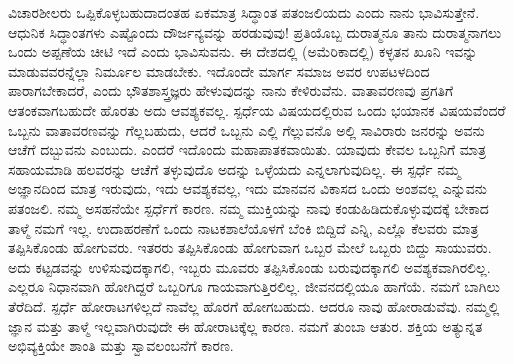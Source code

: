 ವಿಚಾರಶೀಲರು ಒಪ್ಪಿಕೊಳ್ಳಬಹುದಾದಂತಹ ಏಕಮಾತ್ರ ಸಿದ್ಧಾಂತ ಪತಂಜಲಿಯದು ಎಂದು ನಾನು ಭಾವಿಸುತ್ತೇನೆ. ಆಧುನಿಕ ಸಿದ್ಧಾಂತಗಳು ಎಷ್ಟೊಂದು ದೌರ್ಜನ್ಯವನ್ನು ಹರಡುವುವು! ಪ್ರತಿಯೊಬ್ಬ ದುರಾತ್ಮನೂ ತಾನು ದುರಾತ್ಮನಾಗಲು ಒಂದು ಅಪ್ಪಣೆಯ ಚೀಟಿ ಇದೆ ಎಂದು ಭಾವಿಸುವನು. ಈ ದೇಶದಲ್ಲಿ (ಅಮೆರಿಕಾದಲ್ಲಿ) ಕಳ್ಳತನ ಖೂನಿ ಇವನ್ನು ಮಾಡುವವರನ್ನೆಲ್ಲಾ ನಿರ್ಮೂಲ ಮಾಡಬೇಕು. ಇದೊಂದೇ ಮಾರ್ಗ ಸಮಾಜ ಅವರ ಉಪಟಳದಿಂದ ಪಾರಾಗಬೇಕಾದರೆ, ಎಂದು ಭೌತಶಾಸ್ತ್ರಜ್ಞರು ಹೇಳುವುದನ್ನು ನಾನು ಕೇಳಿರುವೆನು. ವಾತಾವರಣವು ಪ್ರಗತಿಗೆ ಆತಂಕವಾಗಬಹುದೇ ಹೊರತು ಅದು ಆವಶ್ಯಕವಲ್ಲ. ಸ್ಪರ್ಧೆಯ ವಿಷಯದಲ್ಲಿರುವ ಒಂದು ಭಯಾನಕ ವಿಷಯವೆಂದರೆ ಒಬ್ಬನು ವಾತಾವರಣವನ್ನು ಗೆಲ್ಲಬಹುದು, ಆದರೆ ಒಬ್ಬನು ಎಲ್ಲಿ ಗೆಲ್ಲುವನೊ ಅಲ್ಲಿ ಸಾವಿರಾರು ಜನರನ್ನು ಅವನು ಆಚೆಗೆ ದಬ್ಬುವನು ಎಂಬುದು. ಎಂದರೆ ಇದೊಂದು ಮಹಾಪಾತಕವಾಯಿತು. ಯಾವುದು ಕೇವಲ ಒಬ್ಬನಿಗೆ ಮಾತ್ರ ಸಹಾಯಮಾಡಿ ಹಲವರನ್ನು ಆಚೆಗೆ ತಳ್ಳುವುದೊ ಅದನ್ನು ಒಳ್ಳೆಯದು ಎನ್ನಲಾಗುವುದಿಲ್ಲ. ಈ ಸ್ಪರ್ಧೆ ನಮ್ಮ ಅಜ್ಞಾನದಿಂದ ಮಾತ್ರ ಇರುವುದು, ಇದು ಆವಶ್ಯಕವಲ್ಲ, ಇದು ಮಾನವನ ವಿಕಾಸದ ಒಂದು ಅಂಶವಲ್ಲ ಎನ್ನುವನು ಪತಂಜಲಿ. ನಮ್ಮ ಅಸಹನೆಯೇ ಸ್ಪರ್ಧೆಗೆ ಕಾರಣ. ನಮ್ಮ ಮುಕ್ತಿಯನ್ನು ನಾವು ಕಂಡುಹಿಡಿದುಕೊಳ್ಳುವುದಕ್ಕೆ ಬೇಕಾದ ತಾಳ್ಮೆ ನಮಗೆ ಇಲ್ಲ. ಉದಾಹರಣೆಗೆ ಒಂದು ನಾಟಕಶಾಲೆಯೊಳಗೆ ಬೆಂಕಿ ಬಿದ್ದಿದೆ ಎನ್ನಿ, ಎಲ್ಲೊ ಕೆಲವರು ಮಾತ್ರ ತಪ್ಪಿಸಿಕೊಂಡು ಹೋಗುವರು. ಇತರರು ತಪ್ಪಿಸಿಕೊಂಡು ಹೋಗುವಾಗ ಒಬ್ಬರ ಮೇಲೆ ಒಬ್ಬರು ಬಿದ್ದು ಸಾಯುವರು. ಅದು ಕಟ್ಟಡವನ್ನು ಉಳಿಸುವುದಕ್ಕಾಗಲಿ, ಇಬ್ಬರು ಮೂವರು ತಪ್ಪಿಸಿಕೊಂಡು ಬರುವುದಕ್ಕಾಗಲಿ ಅವಶ್ಯಕವಾಗಿರಲಿಲ್ಲ. ಎಲ್ಲರೂ ನಿಧಾನವಾಗಿ ಹೋಗಿದ್ದರೆ ಒಬ್ಬರಿಗೂ ಗಾಯವಾಗುತ್ತಿರಲಿಲ್ಲ. ಜೀವನದಲ್ಲಿಯೂ ಹಾಗೆಯೆ. ನಮಗೆ ಬಾಗಿಲು ತೆರೆದಿದೆ. ಸ್ಪರ್ಧೆ ಹೋರಾಟಗಳಿಲ್ಲದೆ ನಾವೆಲ್ಲ ಹೊರಗೆ ಹೋಗಬಹುದು. ಆದರೂ ನಾವು ಹೋರಾಡುವೆವು. ನಮ್ಮಲ್ಲಿ ಜ್ಞಾನ ಮತ್ತು ತಾಳ್ಮೆ ಇಲ್ಲವಾಗಿರುವುದೇ ಈ ಹೋರಾಟಕ್ಕೆಲ್ಲ ಕಾರಣ. ನಮಗೆ ತುಂಬಾ ಆತುರ. ಶಕ್ತಿಯ ಅತ್ಯುನ್ನತ ಅಭಿವ್ಯಕ್ತಿಯೇ ಶಾಂತಿ ಮತ್ತು ಸ್ವಾವಲಂಬನೆಗೆ ಕಾರಣ.

